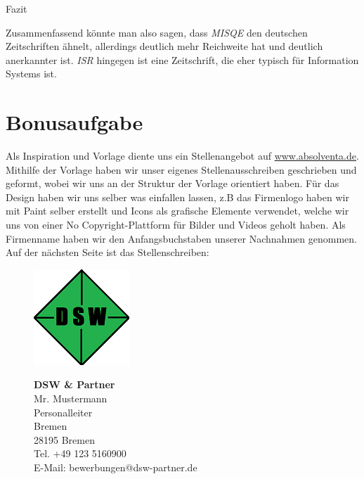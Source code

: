 \documentclass[12pt,utf8]{scrartcl}
\begin{document}
{\Large Fazit}

Zusammenfassend könnte man also sagen, dass \emph{MISQE} den deutschen Zeitschriften ähnelt, allerdings deutlich mehr Reichweite hat und deutlich anerkannter ist. \emph{ISR} hingegen ist eine Zeitschrift, die eher typisch für Information Systems ist.

\section{\label{sec:bonus}Bonusaufgabe}

Als Inspiration und Vorlage diente uns ein Stellenangebot auf \href{https://www.absolventa.de/stellenangebote/289852-p-junior-it-consultant-m-w-business-intelligence#external-job-offer}{www.absolventa.de}.\cite{online1} Mithilfe der Vorlage haben wir unser eigenes Stellenausschreiben geschrieben und geformt, wobei wir uns an der Struktur der Vorlage orientiert haben. Für das Design haben wir uns selber was einfallen lassen, z.B das Firmenlogo haben wir mit Paint selber erstellt und Icons als grafische Elemente verwendet, welche wir uns von einer No Copyright-Plattform für Bilder und Videos geholt haben.\cite{online2} Als Firmenname haben wir den Anfangsbuchstaben unserer Nachnahmen genommen. Auf der nächsten Seite ist das Stellenschreiben:

\newpage
\begin{figure}[htbp]
	\begin{minipage}[t]{4cm}
		\vspace{0pt}
		\centering
		\includegraphics{images/Logo}
		\label{fig:Logo}
	\end{minipage}
	\hfill
	\begin{minipage}[t]{4cm}
		\vspace{0pt}
		\scriptsize
		\textbf{DSW \& Partner}\\
		Mr. Mustermann\\
		Personalleiter\\
		Bremen\\
		28195 Bremen\\
		Tel. +49 123 5160900 \\
		E-Mail: bewerbungen@dsw-partner.de
	\end{minipage}
\end{figure}
\end{document}
